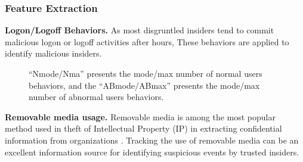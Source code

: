 \documentclass[conference]{IEEEtran}
\begin{document}
\subsubsection{Feature Extraction}


\textbf{Logon/Logoff Behaviors.} 
As most disgruntled insiders tend to
commit malicious logon or logoff activities after hours,  These behaviors are applied to identify malicious insiders.



\begin{figure}[!t]
\centering
{} 
\caption{  ``Nmode/Nma''
presents the mode/max number of normal users behaviors, and
the ``ABmode/ABmax'' presents the mode/max number of abnormal users
behaviors. }
\label{fig4}
\end{figure}

\noindent \textbf{Removable media usage.}
Removable media is among the most popular method used in theft of Intellectual Property (IP) in extracting confidential information from organizations \cite{b18}. Tracking the use of removable media can be an excellent information source for identifying suspicious events by trusted insiders.
\end{document}
